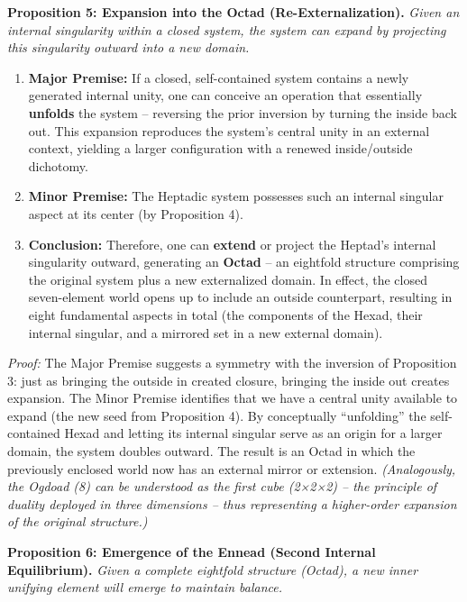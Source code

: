 \documentclass[11pt]{article}
\theoremstyle{plain}
\begin{document}
\textbf{Proposition 5: Expansion into the Octad (Re-Externalization).} \textit{Given an internal singularity within a closed system, the system can expand by projecting this singularity outward into a new domain.}

\begin{enumerate}
    \item \textbf{Major Premise:} If a closed, self-contained system contains a newly generated internal unity, one can conceive an operation that essentially \textbf{unfolds} the system – reversing the prior inversion by turning the inside back out. This expansion reproduces the system’s central unity in an external context, yielding a larger configuration with a renewed inside/outside dichotomy.
    \item \textbf{Minor Premise:} The Heptadic system possesses such an internal singular aspect at its center (by Proposition 4).
    \item \textbf{Conclusion:} Therefore, one can \textbf{extend} or project the Heptad’s internal singularity outward, generating an \textbf{Octad} – an eightfold structure comprising the original system plus a new externalized domain. In effect, the closed seven-element world opens up to include an outside counterpart, resulting in eight fundamental aspects in total (the components of the Hexad, their internal singular, and a mirrored set in a new external domain).
\end{enumerate}

\textit{Proof:} The Major Premise suggests a symmetry with the inversion of Proposition 3: just as bringing the outside in created closure, bringing the inside out creates expansion. The Minor Premise identifies that we have a central unity available to expand (the new seed from Proposition 4). By conceptually “unfolding” the self-contained Hexad and letting its internal singular serve as an origin for a larger domain, the system doubles outward. The result is an Octad in which the previously enclosed world now has an external mirror or extension. \textit{(Analogously, the Ogdoad (8) can be understood as the first cube (2×2×2) – the principle of duality deployed in three dimensions – thus representing a higher-order expansion of the original structure.)}

\textbf{Proposition 6: Emergence of the Ennead (Second Internal Equilibrium).} \textit{Given a complete eightfold structure (Octad), a new inner unifying element will emerge to maintain balance.}
\end{document}
